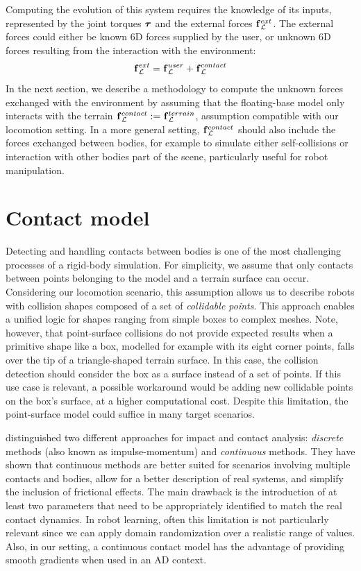 Computing the evolution of this system requires the knowledge of its inputs, represented by the joint torques $\boldsymbol{\tau}$ and the external forces $\prescript{}{}{\mathbf{f}}_{\mathcal{L}}^{ext}$.
The external forces could either be known 6D forces supplied by the user, or unknown 6D forces resulting from the interaction with the environment:
%
\begin{equation}
    \label{eq:decomposition_external_forces}
    \prescript{}{}{\mathbf{f}}_\mathcal{L}^{ext} = \prescript{}{}{\mathbf{f}}_\mathcal{L}^{user} + \prescript{}{}{\mathbf{f}}_\mathcal{L}^{contact}
\end{equation}
%
In the next section, we describe a methodology to compute the unknown forces exchanged with the environment by assuming that the floating-base model only interacts with the terrain $\prescript{}{}{\mathbf{f}}_\mathcal{L}^{contact} := \prescript{}{}{\mathbf{f}}_\mathcal{L}^{terrain}$, assumption compatible with our locomotion setting.
In a more general setting, $\prescript{}{}{\mathbf{f}}_\mathcal{L}^{contact}$ should also include the forces exchanged between bodies, for example to simulate either self-collisions or interaction with other bodies part of the scene, particularly useful for robot manipulation.

\section{Contact model}
\label{section:contact_model}

Detecting and handling contacts between bodies is one of the most challenging processes of a rigid-body simulation.
For simplicity, we assume that only contacts between points belonging to the model and a terrain surface can occur.
Considering our locomotion scenario, this assumption allows us to describe robots with collision shapes composed of a set of \emph{collidable points}.
This approach enables a unified logic for shapes ranging from simple boxes to complex meshes.
Note, however, that point-surface collisions do not provide expected results when a primitive shape like a box, modelled for example with its eight corner points, falls over the tip of a triangle-shaped terrain surface.
In this case, the collision detection should consider the box as a surface instead of a set of points.
If this use case is relevant, a possible workaround would be adding new collidable points on the box's surface, at a higher computational cost.
Despite this limitation, the point-surface model could suffice in many target scenarios.

\textcite{gilardi_literature_2002} distinguished two different approaches for impact and contact analysis: \emph{discrete} methods (also known as impulse-momentum) and \emph{continuous} methods.
They have shown that continuous methods are better suited for scenarios involving multiple contacts and bodies, allow for a better description of real systems, and simplify the inclusion of frictional effects.
The main drawback is the introduction of at least two parameters that need to be appropriately identified to match the real contact dynamics.
In robot learning, often this limitation is not particularly relevant since we can apply domain randomization over a realistic range of values.
Also, in our setting, a continuous contact model has the advantage of providing smooth gradients when used in an \ac{AD} context.

